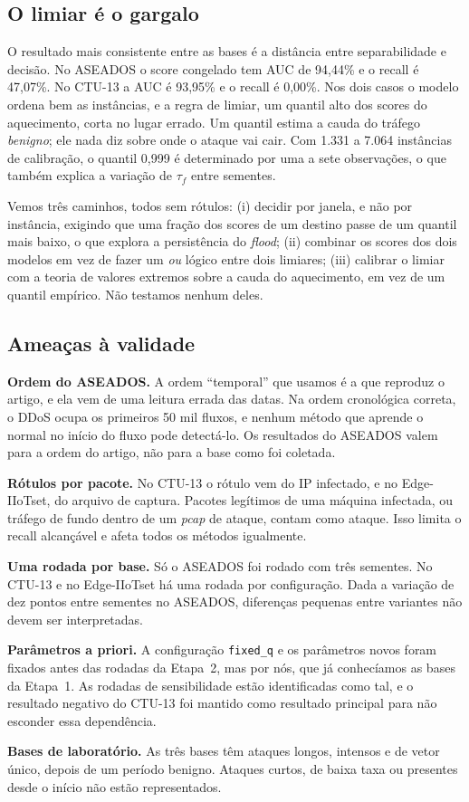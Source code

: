 \subsection{O limiar é o gargalo}
O resultado mais consistente entre as bases é a distância entre separabilidade e decisão. No
ASEADOS o score congelado tem AUC de 94,44\% e o recall é 47,07\%. No CTU-13 a AUC é 93,95\% e o
recall é 0,00\%. Nos dois casos o modelo ordena bem as instâncias, e a regra de limiar, um quantil
alto dos scores do aquecimento, corta no lugar errado. Um quantil estima a cauda do tráfego
\emph{benigno}; ele nada diz sobre onde o ataque vai cair. Com 1.331 a 7.064 instâncias de
calibração, o quantil 0,999 é determinado por uma a sete observações, o que também explica a
variação de $\tau_f$ entre sementes.

Vemos três caminhos, todos sem rótulos: (i) decidir por janela, e não por instância, exigindo que
uma fração dos scores de um destino passe de um quantil mais baixo, o que explora a persistência do
\emph{flood}; (ii) combinar os scores dos dois modelos em vez de fazer um \emph{ou} lógico entre
dois limiares; (iii) calibrar o limiar com a teoria de valores extremos sobre a cauda do
aquecimento, em vez de um quantil empírico. Não testamos nenhum deles.

\subsection{Ameaças à validade}
\textbf{Ordem do ASEADOS.} A ordem ``temporal'' que usamos é a que reproduz o artigo, e ela vem de
uma leitura errada das datas. Na ordem cronológica correta, o DDoS ocupa os primeiros 50 mil
fluxos, e nenhum método que aprende o normal no início do fluxo pode detectá-lo. Os resultados do
ASEADOS valem para a ordem do artigo, não para a base como foi coletada.

\textbf{Rótulos por pacote.} No CTU-13 o rótulo vem do IP infectado, e no Edge-IIoTset, do arquivo
de captura. Pacotes legítimos de uma máquina infectada, ou tráfego de fundo dentro de um
\emph{pcap} de ataque, contam como ataque. Isso limita o recall alcançável e afeta todos os métodos
igualmente.

\textbf{Uma rodada por base.} Só o ASEADOS foi rodado com três sementes. No CTU-13 e no
Edge-IIoTset há uma rodada por configuração. Dada a variação de dez pontos entre sementes no
ASEADOS, diferenças pequenas entre variantes não devem ser interpretadas.

\textbf{Parâmetros a priori.} A configuração \texttt{fixed\_q} e os parâmetros novos foram fixados
antes das rodadas da Etapa~2, mas por nós, que já conhecíamos as bases da Etapa~1. As rodadas de
sensibilidade estão identificadas como tal, e o resultado negativo do CTU-13 foi mantido como
resultado principal para não esconder essa dependência.

\textbf{Bases de laboratório.} As três bases têm ataques longos, intensos e de vetor único, depois
de um período benigno. Ataques curtos, de baixa taxa ou presentes desde o início não estão
representados.
